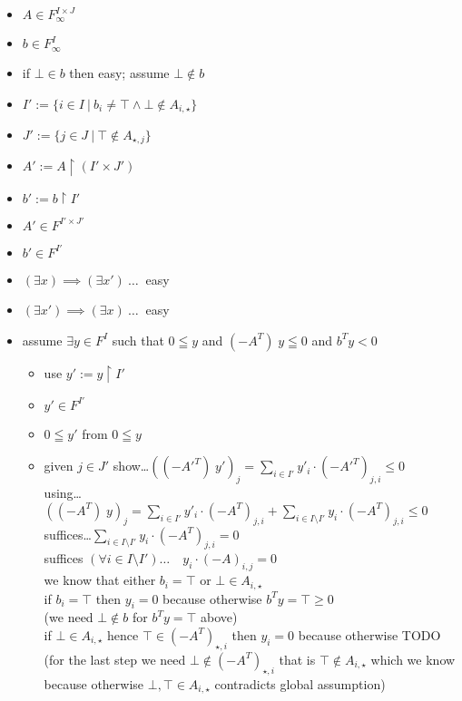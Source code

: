 \documentclass[]{article}
\begin{document}
\begin{itemize}
\item $ A \in F_\infty^{I \times J} $
\item $ b \in F_\infty^{I} $
\item if $\bot \in b$ then easy; assume $\bot \notin b$
\item $ I' := \{ i \in I ~|~ b_i \neq \top \wedge \bot \notin A_{i, \star} \} $
\item $ J' := \{ j \in J ~|~ \top \notin A_{\star, j}  \} $
\item $ A' := A \restriction (I' \times J') $
\item $ b' := b \restriction I' $
\item $ A' \in F^{I' \times J'} $
\item $ b' \in F^{I'} $
\item $ (\exists x) \implies (\exists x') \ \dots \ $ easy
\item $ (\exists x') \implies (\exists x) \ \dots \ $ easy
\item assume $\exists y \in F^I$ such that $0 \leqq y$ and $(-A^T)\; y \leqq 0$ and $b^T y < 0$
\begin{itemize}
\item use $y' := y \restriction I'$
\item $ y' \in F^{I'} $
\item $0 \leqq y'$ from $0 \leqq y$
\item given $j \in J'$ show\dots $ ((-A'^T)\; y')_{j} = \sum\limits_{i \in I'} y'_i \cdot (-A'^T)_{j,i} \le 0 $\\
using\dots $ ((-A^T)\; y)_j =
\sum\limits_{i \in I'} y'_i \cdot (-A^T)_{j,i} + \sum\limits_{i \in I \setminus I'} y_i \cdot (-A^T)_{j,i} \le 0 $
suffices\dots $ \sum\limits_{i \in I \setminus I'} y_i \cdot (-A^T)_{j,i} = 0 $ \\
suffices $(\forall i \in I \setminus I')\dots\quad y_i \cdot (-A)_{i,j} = 0 $ \\
we know that either $ b_i = \top $ or $ \bot \in A_{i, \star} $ \\
if $ b_i = \top $ then $ y_i = 0 $ because otherwise $b^T y = \top \ge 0$ \\
(we need $\bot \notin b$ for $b^T y = \top$ above) \\
if $ \bot \in A_{i, \star} $ hence $ \top \in (-A^T)_{\star, i} $ then $ y_i = 0 $ because otherwise TODO
(for the last step we need $ \bot \notin (-A^T)_{\star, i} $ that is $ \top \notin A_{i, \star} $ which
we know because otherwise $ \bot,\!\top \in A_{i, \star} $ contradicts global assumption) \\

\end{itemize}
\end{itemize}
\end{document}
